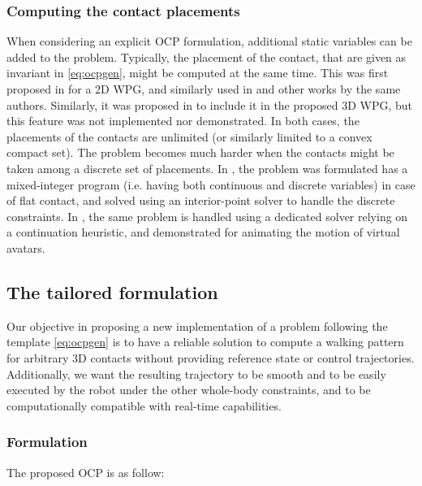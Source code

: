\subsubsection{Computing the contact placements}
When considering an explicit OCP formulation, additional static variables can be added to the problem. Typically, the placement of the contact, that are given as invariant in \eqref{eq:ocpgen}, might be computed at the same time. This was first proposed in \cite{herdt:ar:2010} for a 2D WPG, and similarly used in \cite{Sherikov:ichr:2014} and other works by the same authors. Similarly, it was proposed in \cite{rotella_humanoid15} to include it in the proposed 3D WPG, but this feature was not implemented nor demonstrated. In both cases, the placements of the contacts are unlimited (or similarly limited to a convex compact set). The problem becomes much harder when the contacts might be taken among a discrete set of placements. In \cite{deits_ichr14}, the problem was formulated has a mixed-integer program (i.e. having both continuous and discrete variables) in case of flat contact, and solved using an interior-point solver to handle the discrete constraints. In \cite{mordatch:tog:12}, the same problem is handled using a dedicated solver relying on a continuation heuristic, and demonstrated for animating the motion of virtual avatars.

\subsection{The tailored formulation}
\label{subsec:our_formulation}

Our objective in proposing a new implementation of a problem following the template \eqref{eq:ocpgen} is to have a reliable solution to compute a walking pattern for arbitrary 3D contacts without providing reference state or control trajectories. Additionally, we want the resulting trajectory to be smooth and to be easily executed by the robot under the other whole-body constraints, and to be computationally compatible with real-time capabilities.

\subsubsection{Formulation}
The proposed OCP is as follow:

